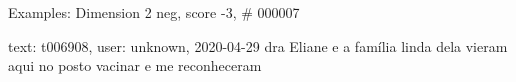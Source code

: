 \begin{frame}{Examples: Dimension 2 neg, score -3, \# 000007}
\footnotesize
\begin{alertblock}{text: t006908, user: unknown, 2020-04-29}
dra Eliane e a família linda dela vieram aqui no posto vacinar e me 
reconheceram \textbf{} 
\end{alertblock}
\end{frame}
